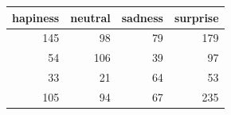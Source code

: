 \begin{tabular}{rrrr}
\toprule
hapiness & neutral & sadness & surprise \\
\midrule
145 & 98 & 79 & 179 \\
54 & 106 & 39 & 97 \\
33 & 21 & 64 & 53 \\
105 & 94 & 67 & 235 \\
\bottomrule
\end{tabular}

